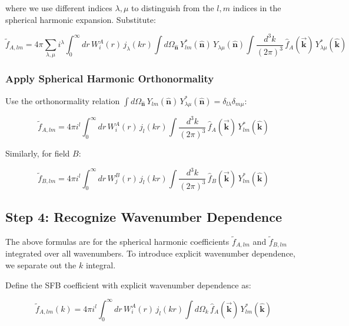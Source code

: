 where we use different indices $\lambda, \mu$ to distinguish from the $l, m$ indices in the spherical harmonic expansion. Substitute:

\begin{equation}
    \tilde{f}_{A,lm} = 4\pi \sum_{\lambda,\mu} i^{\lambda} \int_0^{\infty} dr \, W_i^A(r) \, j_{\lambda}(kr) \int d\Omega_{\hat{\mathbf{n}}} \, Y_{lm}^*(\hat{\mathbf{n}}) \, Y_{\lambda\mu}(\hat{\mathbf{n}}) \int \frac{d^3k}{(2\pi)^3} \, \hat{f}_A(\vec{\mathbf{k}}) \, Y_{\lambda\mu}^*(\hat{\mathbf{k}})
\label{eq:sh_coeff_A_rayleigh}
\end{equation}

\subsubsection{Apply Spherical Harmonic Orthonormality}

Use the orthonormality relation $\int d\Omega_{\hat{\mathbf{n}}} \, Y_{lm}(\hat{\mathbf{n}}) \, Y_{\lambda\mu}^*(\hat{\mathbf{n}}) = \delta_{l\lambda} \delta_{m\mu}$:

\begin{equation}
    \tilde{f}_{A,lm} = 4\pi i^{l} \int_0^{\infty} dr \, W_i^A(r) \, j_{l}(kr) \int \frac{d^3k}{(2\pi)^3} \, \hat{f}_A(\vec{\mathbf{k}}) \, Y_{lm}^*(\hat{\mathbf{k}})
\label{eq:sh_coeff_A_final}
\end{equation}

Similarly, for field $B$:

\begin{equation}
    \tilde{f}_{B,lm} = 4\pi i^{l} \int_0^{\infty} dr \, W_j^B(r) \, j_{l}(kr) \int \frac{d^3k}{(2\pi)^3} \, \hat{f}_B(\vec{\mathbf{k}}) \, Y_{lm}^*(\hat{\mathbf{k}})
\label{eq:sh_coeff_B_final}
\end{equation}

\subsection{Step 4: Recognize Wavenumber Dependence}

The above formulas are for the spherical harmonic coefficients $\tilde{f}_{A,lm}$ and $\tilde{f}_{B,lm}$ integrated over all wavenumbers. To introduce explicit wavenumber dependence, we separate out the $k$ integral. 

Define the SFB coefficient with explicit wavenumber dependence as:

\begin{equation}
    \tilde{f}_{A,lm}(k) = 4\pi i^{l} \int_0^{\infty} dr \, W_i^A(r) \, j_{l}(kr) \int d\Omega_k \, \hat{f}_A(\vec{\mathbf{k}}) \, Y_{lm}^*(\hat{\mathbf{k}})
\label{eq:sfb_coeff_A_with_k}
\end{equation}

